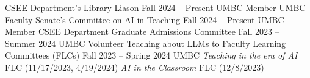 {\color{black}\fontsize{12pt}{1em}} 

\begin{cventries}
\cventry
    {}
    {CSEE Department's Library Liason}
    {Fall 2024 -- Present}
    {UMBC}
    {}  
\cventry
    {Member}
    {UMBC Faculty Senate's Committee on AI in Teaching}
    {Fall 2024 -- Present}
    {UMBC}
    {}  
\cventry
    {Member}
    {CSEE Department Graduate Admissions Committee}
    {Fall 2023 -- Summer 2024}
    {UMBC}
    {}    
\cventry
    {Volunteer}
    {Teaching about LLMs to Faculty Learning Committees (FLCs)}
    {Fall 2023 -- Spring 2024}
    {UMBC}
    {\textit{Teaching in the era of AI} FLC (11/17/2023, 4/19/2024)\newline
    \textit{AI in the Classroom} FLC (12/8/2023)}   
\end{cventries}


